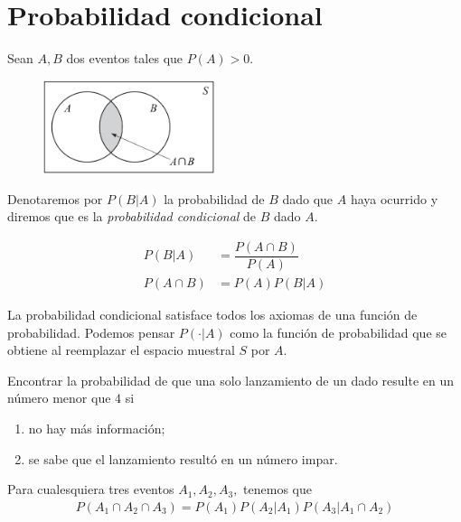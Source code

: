  \section{Probabilidad condicional}
{}
Sean $A,B$ dos eventos tales que $P(A)>0.$
\begin{figure}
	\centering
	\includegraphics[width=5cm,keepaspectratio=true]{./pe/pands0103.png}
	\label{pands0103}
\end{figure}

Denotaremos por $P(B|A)$
la probabilidad de $B$ dado que $A$ haya ocurrido y diremos que es la \emph{probabilidad condicional} de $B$ dado $A.$


\begin{defn}
	\begin{align}
		P(B|A)&=\dfrac{P(A\cap B)}{P(A)} \\
		P(A\cap B) &= P(A)P(B|A)
	\end{align}
\end{defn}


{}
\begin{rem}
	La probabilidad condicional satisface todos los axiomas de una función de probabilidad.  Podemos pensar $P(\cdot|A)$ como la función de probabilidad que se obtiene al reemplazar el espacio muestral $S$ por $A.$
\end{rem}


{}
\begin{ejemplo}
	\label{exmp:1.13}
	Encontrar la probabilidad de que una solo lanzamiento de un dado resulte en un número menor que $4$ si
	\begin{enumerate}
		\item no hay más información; 
		\item se sabe que el lanzamiento resultó en un número impar.
	\end{enumerate}
	
\end{ejemplo}


{}
\begin{thm}
	\label{thm:1.9}
	Para cualesquiera tres eventos $A_{1},A_{2},A_{3},$ tenemos que
	\begin{align}
		\label{1.19}
		P(A_{1} \cap A_{2} \cap A_{3})=P(A_{1})P(A_{2}|A_{1})P(A_{3}|A_{1} \cap A_{2})
	\end{align}
\end{thm}


